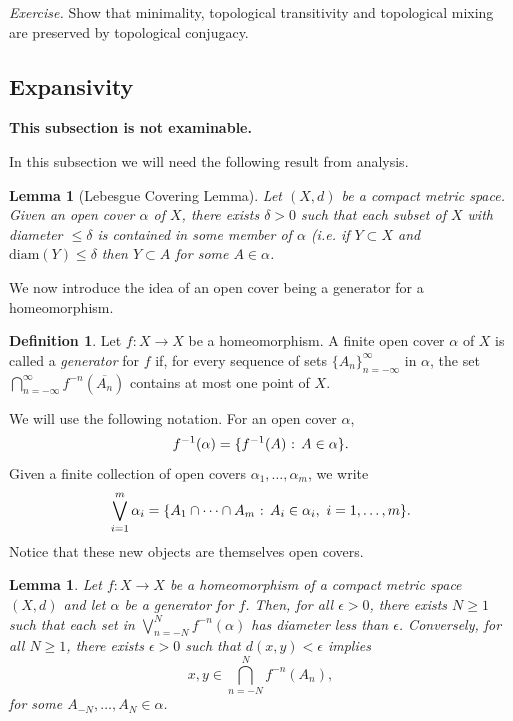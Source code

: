 \documentclass[12pt]{article}
\newtheorem{lemma}[theorem]{Lemma}
\theoremstyle{definition}
\newtheorem{definition}[theorem]{Definition}
\theoremstyle{remark}
\begin{document}
\medskip
\noindent
{\it Exercise.}
Show that minimality, topological transitivity and topological mixing are preserved by topological
conjugacy.

\subsection{Expansivity}

\noindent
{\bf This subsection is not examinable.}

In this subsection we will need the following result from analysis.

\begin{lemma}[Lebesgue Covering Lemma]
Let $(X,d)$ be a compact metric space. Given an open cover $\alpha$ of $X$, there exists 
$\delta>0$ such that each subset of $X$ with diameter $\le \delta$ is contained in some member of $\alpha$ (i.e. if $Y \subset X$ and $\mathrm{diam}(Y) \le \delta$ then $Y \subset A$ for some
$A \in \alpha$.
\end{lemma}

We now introduce the idea of an open cover being a generator for a homeomorphism. 

\begin{definition}
Let $f :X \to X$ be a homeomorphism. A finite open cover $\alpha$ of $X$ is called a {\it generator} for $f$ if, for every sequence of sets $\{A_n\}_{n=-\infty}^\infty$ in $\alpha$, the set
$\bigcap_{n=-\infty}^\infty f^{-n}(\overline{A_n})$ contains at most one point of $X$.
\end{definition}

We will use the following notation. For an open cover $\alpha$,
\[
f^{-1}(\alpha) = \{f^{-1}(A) \hbox{ : } A \in \alpha\}.
\]
Given a finite collection of open covers $\alpha_1,\ldots,\alpha_m$, we write
\[
\bigvee_{i=1}^m \alpha_i = \{A_1 \cap \cdots \cap A_m \hbox{ : } A_i \in \alpha_i, \ i=1,\ldots,m\}.
\]
Notice that these new objects are themselves open covers.

\begin{lemma}
Let $f :X \to X$ be a homeomorphism of a compact metric space
$(X,d)$ and let $\alpha$ be a generator for $f$.
Then, for all $\epsilon>0$, there exists $N 
\ge 1$ such that each set in $\bigvee_{n=-N}^N f^{-n}(\alpha)$ has diameter less than $\epsilon$.
Conversely, for all $N \ge 1$, there exists $\epsilon>0$ such that $d(x,y)< \epsilon$ implies
\[
x,y \in \bigcap_{n=-N}^N f^{-n}(A_n),
\]
for some $A_{-N},\ldots,A_N \in \alpha$.
\end{lemma}
\end{document}
